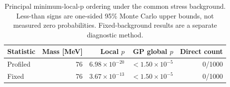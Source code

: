 \begin{table}[H]\centering\small
\begin{tabular}{lrrrr}\toprule
Statistic & Mass [MeV] & Local $p$ & GP global $p$ & Direct count\\\midrule
Profiled & 76 & $6.98\times10^{-20}$ & $<$$1.50\times10^{-5}$ & 0/1000 \\
Fixed & 76 & $3.67\times10^{-13}$ & $<$$1.50\times10^{-5}$ & 0/1000 \\
\bottomrule\end{tabular}
\caption{Principal minimum-local-p ordering under the common stress background. Less-than signs are one-sided 95\% Monte Carlo upper bounds, not measured zero probabilities. Fixed-background results are a separate diagnostic method.}\end{table}

